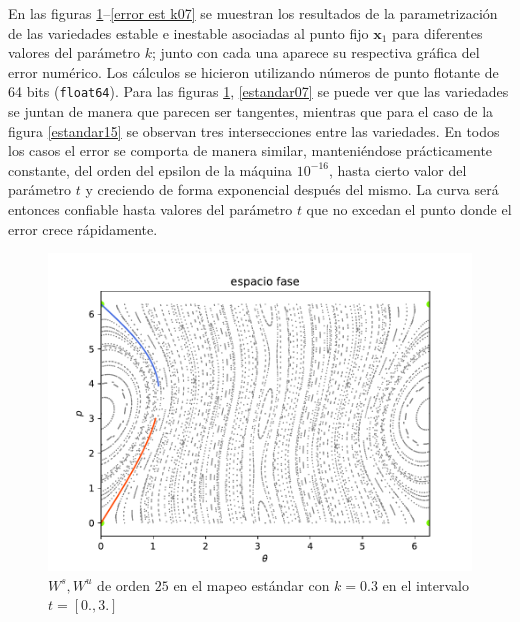 En las figuras \ref{estandar03}--\ref{error est k07} se muestran los resultados de la parametrización de las variedades estable e inestable asociadas al punto fijo $\mathbf{x}_{1}$ para diferentes valores del parámetro $k$; junto con cada una aparece su respectiva gráfica del error numérico.   Los cálculos se hicieron utilizando números de punto flotante de 64 bits (\texttt{float64}). Para las figuras \ref{estandar03}, \ref{estandar07} se puede ver que las variedades se juntan de manera que parecen ser tangentes, mientras que para el caso de la figura \ref{estandar15} se observan tres intersecciones entre las variedades. En todos los casos el error se comporta de manera similar, manteniéndose prácticamente constante, del orden del epsilon de la máquina $10^{-16}$, hasta cierto valor del parámetro $t$ y creciendo de forma exponencial después del mismo. La curva será entonces confiable hasta valores del parámetro $t$ que no excedan el punto donde el error crece rápidamente.  \\

\begin{figure}[H]
	\centering
	\includegraphics[scale=0.7]{k03}
	\caption{\footnotesize $W^{s},W^{u}$ de orden $25$ en el mapeo estándar con $k=0.3$ en el intervalo $t=[0.,3.]$}
	\label{estandar03}
\end{figure}

